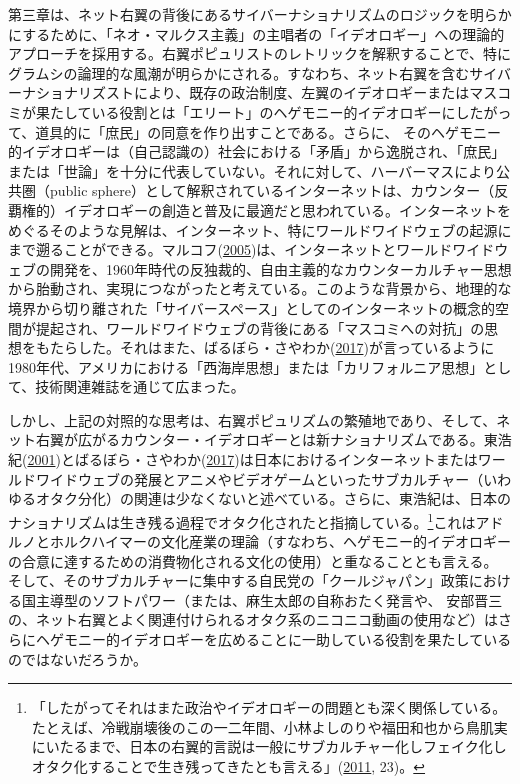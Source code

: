 \documentclass[10pt,british,A4paper,twoside]{memoir}
\begin{document}
第三章は、ネット右翼の背後にあるサイバーナショナリズムのロジックを明らかにするために、「ネオ・マルクス主義」の主唱者の「イデオロギー」への理論的アプローチを採用する。右翼ポピュリストのレトリックを解釈することで、特にグラムシの論理的な風潮が明らかにされる。すなわち、ネット右翼を含むサイバーナショナリズストにより、既存の政治制度、左翼のイデオロギーまたはマスコミが果たしている役割とは「エリート」のヘゲモニー的イデオロギーにしたがって、道具的に「庶民」の同意を作り出すことである。さらに、
そのヘゲモニー的イデオロギーは（自己認識の）社会における「矛盾」から逸脱され、「庶民」または「世論」を十分に代表していない。それに対して、ハーバーマスにより公共圏（public
sphere）として解釈されているインターネットは、カウンター（反覇権的）イデオロギーの創造と普及に最適だと思われている。インターネットをめぐるそのような見解は、インターネット、特にワールドワイドウェブの起源にまで遡ることができる。マルコフ(\protect\hyperlink{ref-markoff_what_2005}{2005})は、インターネットとワールドワイドウェブの開発を、1960年時代の反独裁的、自由主義的なカウンターカルチャー思想から胎動され、実現につながったと考えている。このような背景から、地理的な境界から切り離された「サイバースペース」としてのインターネットの概念的空間が提起され、ワールドワイドウェブの背後にある「マスコミへの対抗」の思想をもたらした。それはまた、ばるぼら・さやわか(\protect\hyperlink{ref-barubora_eng:_2017}{2017})が言っているように1980年代、アメリカにおける「西海岸思想」または「カリフォルニア思想」として、技術関連雑誌を通じて広まった。

しかし、上記の対照的な思考は、右翼ポピュリズムの繁殖地であり、そして、ネット右翼が広がるカウンター・イデオロギーとは新ナショナリズムである。東浩紀(\protect\hyperlink{ref-azuma_otaku:_2001}{2001})とばるぼら・さやわか(\protect\hyperlink{ref-barubora_eng:_2017}{2017})は日本におけるインターネットまたはワールドワイドウェブの発展とアニメやビデオゲームといったサブカルチャー（いわゆるオタク分化）の関連は少なくないと述べている。さらに、東浩紀は、日本のナショナリズムは生き残る過程でオタク化されたと指摘している。\footnote{「したがってそれはまた政治やイデオロギーの問題とも深く関係している。たとえば、冷戦崩壊後のこの一二年間、小林よしのりや福田和也から鳥肌実にいたるまで、日本の右翼的言説は一般にサブカルチャー化しフェイク化しオタク化することで生き残ってきたとも言える」(\protect\hyperlink{ref-azuma_ippan_2011}{2011},
  23)。}これはアドルノとホルクハイマーの文化産業の理論（すなわち、ヘゲモニー的イデオロギーの合意に達するための消費物化される文化の使用）と重なることとも言える。
そして、そのサブカルチャーに集中する自民党の「クールジャパン」政策における国主導型のソフトパワー（または、麻生太郎の自称おたく発言や、
安部晋三の、ネット右翼とよく関連付けられるオタク系のニコニコ動画の使用など）はさらにヘゲモニー的イデオロギーを広めることに一助している役割を果たしているのではないだろうか。
\end{document}
